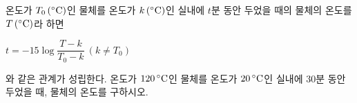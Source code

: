온도가 $T_0\mkern3mu (^\circ\mathrm{C})$인 물체를 온도가 $k\mkern3mu (^\circ\mathrm{C})$인 실내에 $t$분 동안 두었을 때의 물체의 온도를 $T\mkern3mu (^\circ\mathrm{C})$라 하면 \par\smallskip\noindent\hspace*{1.5em}$t=-15\log\dfrac{T-k}{T_0-k}\ (k\ne T_0)$\par\smallskip\noindent 와 같은 관계가 성립한다. 온도가 $120\mkern3mu ^\circ\mathrm{C}$인 물체를 온도가 $20\mkern3mu ^\circ\mathrm{C}$인 실내에 $30$분 동안 두었을 때, 물체의 온도를 구하시오.
